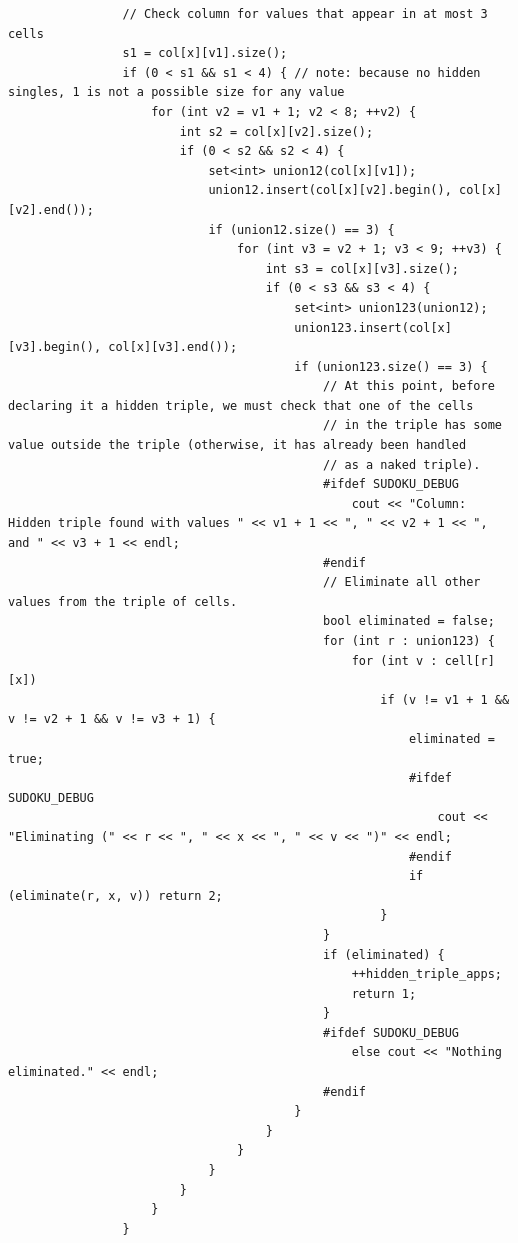 \documentclass{article}
\begin{document}
\begin{lstlisting}
                // Check column for values that appear in at most 3 cells
                s1 = col[x][v1].size();
                if (0 < s1 && s1 < 4) { // note: because no hidden singles, 1 is not a possible size for any value
                    for (int v2 = v1 + 1; v2 < 8; ++v2) {
                        int s2 = col[x][v2].size();
                        if (0 < s2 && s2 < 4) {
                            set<int> union12(col[x][v1]);
                            union12.insert(col[x][v2].begin(), col[x][v2].end());
                            if (union12.size() == 3) {
                                for (int v3 = v2 + 1; v3 < 9; ++v3) {
                                    int s3 = col[x][v3].size();
                                    if (0 < s3 && s3 < 4) {
                                        set<int> union123(union12);
                                        union123.insert(col[x][v3].begin(), col[x][v3].end());
                                        if (union123.size() == 3) {
                                            // At this point, before declaring it a hidden triple, we must check that one of the cells
                                            // in the triple has some value outside the triple (otherwise, it has already been handled
                                            // as a naked triple).
                                            #ifdef SUDOKU_DEBUG
                                                cout << "Column: Hidden triple found with values " << v1 + 1 << ", " << v2 + 1 << ", and " << v3 + 1 << endl;
                                            #endif
                                            // Eliminate all other values from the triple of cells.
                                            bool eliminated = false;
                                            for (int r : union123) {
                                                for (int v : cell[r][x])
                                                    if (v != v1 + 1 && v != v2 + 1 && v != v3 + 1) {
                                                        eliminated = true;
                                                        #ifdef SUDOKU_DEBUG
                                                            cout << "Eliminating (" << r << ", " << x << ", " << v << ")" << endl;
                                                        #endif
                                                        if (eliminate(r, x, v)) return 2;
                                                    }
                                            }
                                            if (eliminated) {
                                                ++hidden_triple_apps;
                                                return 1;
                                            }
                                            #ifdef SUDOKU_DEBUG
                                                else cout << "Nothing eliminated." << endl;
                                            #endif
                                        }
                                    }
                                }
                            }
                        }
                    }
                }


\end{lstlisting}
\end{document}
